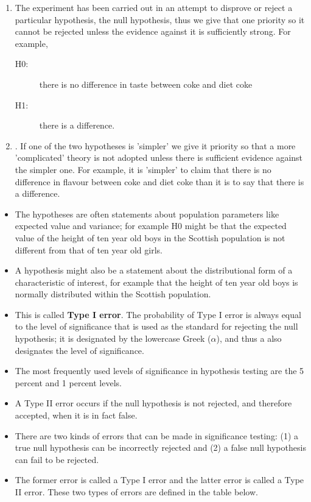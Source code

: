 \documentclass[]{report}
\begin{document}
\begin{enumerate}
\item The experiment has been carried out in an attempt to disprove or reject a particular hypothesis, the null hypothesis, thus we give that one priority so it cannot be rejected unless the evidence against it is sufficiently strong. For example, 

\begin{description}
\item[H0:] there is no difference in taste between coke and diet coke
\item[H1:] there is a difference.
\end{description}
\item. If one of the two hypotheses is 'simpler' we give it priority so that a more 'complicated' theory is not adopted unless there is sufficient evidence against the simpler one. For example, it is 'simpler' to claim that there is no difference in flavour between coke and diet coke than it is to say that there is a difference.
\end{enumerate}



\begin{itemize}
\item The hypotheses are often statements about population parameters like expected value and variance; for example H0 might be that the expected value of the height of ten year old boys in the Scottish population is not different from that of ten year old girls.
\item  A hypothesis might also be a statement about the distributional form of a characteristic of interest, for example that the height of ten year old boys is normally distributed within the Scottish population.

\item This is called \textbf{Type I error}. The probability of Type I error is always equal to the level of significance that is used as the standard for rejecting the null hypothesis; it is designated by the
lowercase Greek  ($\alpha$), and thus a also designates the level of significance. 

\item The most frequently used levels of significance in hypothesis testing are the 5 percent and 1 percent levels.

\item A Type II error occurs if the null hypothesis is not rejected, and therefore accepted, when it is in fact false.

\item There are two kinds of errors that can be made in significance testing: (1) a true null hypothesis can be incorrectly rejected and (2) a false null hypothesis can fail to be rejected. 

\item The former error is called a Type I error and the latter error is called a Type II error. These two types of errors are defined in the table below. 
\end{itemize}
\end{document}
